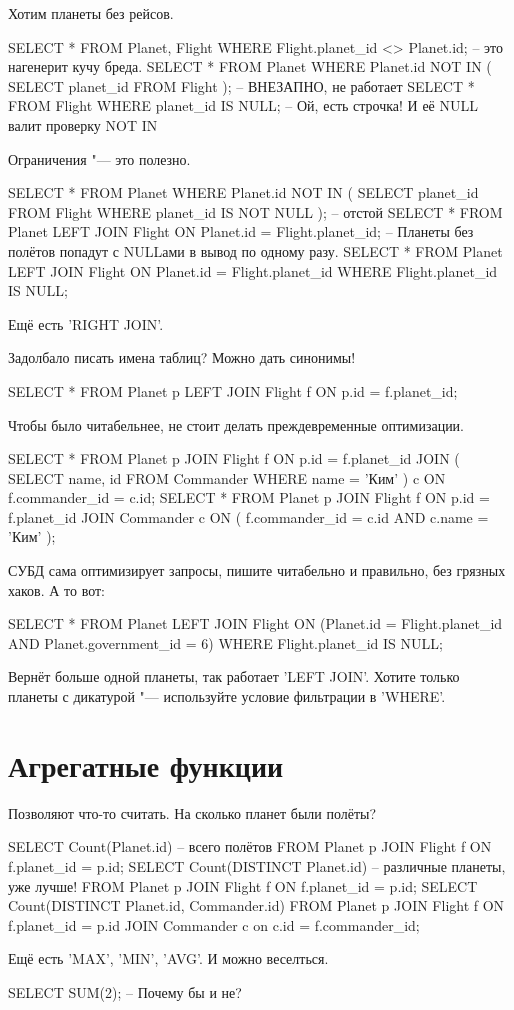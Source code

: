 Хотим планеты без рейсов.
\begin{sqlcode}
SELECT *
	FROM Planet, Flight
	WHERE Flight.planet_id <> Planet.id; -- это нагенерит кучу бреда.
SELECT *
	FROM Planet
	WHERE Planet.id NOT IN (
		SELECT planet_id
			FROM Flight
	);
-- ВНЕЗАПНО, не работает
SELECT * FROM Flight WHERE planet_id IS NULL;
-- Ой, есть строчка! И её NULL валит проверку NOT IN
\end{sqlcode}
Ограничения "---  это полезно.
\begin{sqlcode}
SELECT *
	FROM Planet
	WHERE Planet.id NOT IN (
		SELECT planet_id
			FROM Flight
			WHERE planet_id IS NOT NULL
	);
-- отстой
SELECT *
	FROM Planet
	LEFT JOIN Flight ON Planet.id = Flight.planet_id;
-- Планеты без полётов попадут с NULLами в вывод по одному разу.
SELECT *
	FROM Planet
	LEFT JOIN Flight ON Planet.id = Flight.planet_id
	WHERE Flight.planet_id IS NULL;
\end{sqlcode}
Ещё есть \sql'RIGHT JOIN'.

Задолбало писать имена таблиц?
Можно дать синонимы!
\begin{sqlcode}
SELECT *
	FROM Planet p
	LEFT JOIN Flight f ON p.id = f.planet_id;
\end{sqlcode}

Чтобы было читабельнее, не стоит делать преждевременные оптимизации.
\begin{sqlcode}
SELECT *
	FROM Planet p
	JOIN Flight f ON p.id = f.planet_id
	JOIN (
		SELECT name, id
			FROM Commander
			WHERE name = 'Ким'
	) c ON f.commander_id = c.id;
SELECT *
	FROM Planet p
	JOIN Flight f ON p.id = f.planet_id
	JOIN Commander c ON (
		f.commander_id = c.id
		AND c.name = 'Ким'
	);
\end{sqlcode}
СУБД сама оптимизирует запросы, пишите читабельно и правильно, без грязных хаков.
А то вот:
\begin{sqlcode}
SELECT *
	FROM Planet
	LEFT JOIN Flight ON (Planet.id = Flight.planet_id AND Planet.government_id = 6)
	WHERE Flight.planet_id IS NULL;
\end{sqlcode}
Вернёт больше одной планеты, так работает \sql'LEFT JOIN'.
Хотите только планеты с дикатурой "--- используйте условие фильтрации в \sql'WHERE'.

\section{Агрегатные функции}
Позволяют что-то считать.
На сколько планет были полёты?
\begin{sqlcode}
SELECT Count(Planet.id) -- всего полётов
	FROM Planet p
	JOIN Flight f ON f.planet_id = p.id;
SELECT Count(DISTINCT Planet.id) -- различные планеты, уже лучше!
	FROM Planet p
	JOIN Flight f ON f.planet_id = p.id;
SELECT Count(DISTINCT Planet.id, Commander.id)
	FROM Planet p
	JOIN Flight f ON f.planet_id = p.id
	JOIN Commander c on c.id = f.commander_id;
\end{sqlcode}
Ещё есть \sql'MAX', \sql'MIN', \sql'AVG'.
И можно веселться.
\begin{sqlcode}
SELECT SUM(2); -- Почему бы и не?
\end{sqlcode}

